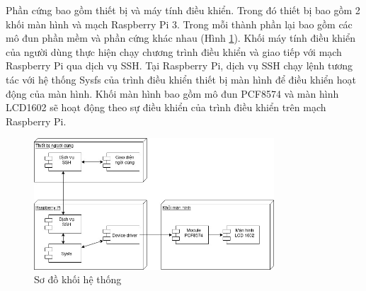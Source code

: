 Phần cứng bao gồm thiết bị và máy tính điều khiển. Trong đó thiết bị bao gồm 2 khối màn hình và mạch Raspberry Pi 3. Trong mỗi thành phần lại bao gồm các mô đun phần mềm và phần cứng khác nhau (Hình \ref{block-diagram}). Khối máy tính điều khiển của người dùng thực hiện chạy chương trình điều khiển và giao tiếp với mạch Raspberry Pi qua dịch vụ SSH. Tại Raspberry Pi, dịch vụ SSH chạy lệnh tương tác với hệ thống Sysfs của trình điều khiển thiết bị màn hình để điều khiển hoạt động của màn hình. Khối màn hình bao gồm mô đun PCF8574 và màn hình LCD1602 sẽ hoạt động theo sự điều khiển của trình điều khiển trên mạch Raspberry Pi.

\begin{figure}[H]
	\centering
	\includegraphics[width=0.8\textwidth]{../images/linux-component.jpg}
	\caption{Sơ đồ khối hệ thống}
	\label{block-diagram}
\end{figure}